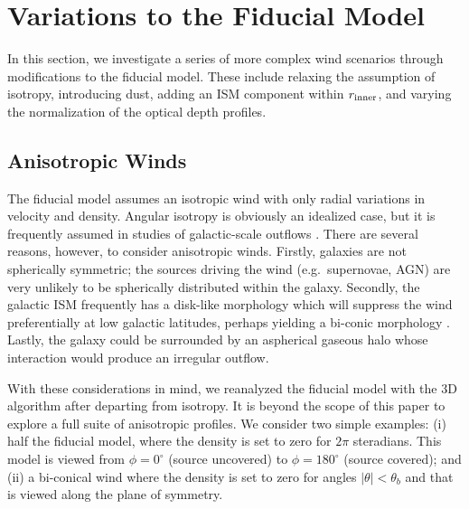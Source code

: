 \documentclass[12pt,preprint]{aastex}
\begin{document}
\section{Variations to the Fiducial Model}
\label{sec:variants}

In this section, we investigate a series of more complex wind
scenarios
through modifications to the fiducial model.  These include relaxing
the assumption of isotropy, introducing dust, adding an ISM
component within $r_{\rm inner}$, and varying the normalization of the
optical depth profiles.

\subsection{Anisotropic Winds}
\label{sec:anisotropic}

The fiducial model assumes an
isotropic wind with only radial variations in velocity and density. 
Angular isotropy is obviously an idealized case, but
it is frequently assumed in studies of galactic-scale outflows
\citep[e.g.][]{steidel+10}.   There are several reasons, however, to
consider anisotropic winds.  Firstly, galaxies are not spherically
symmetric;  the sources driving the
wind (e.g.\ supernovae, AGN) are very unlikely to be spherically distributed
within the galaxy.  
Secondly, the galactic ISM frequently has a disk-like morphology
which will suppress the wind preferentially at low galactic latitudes,
perhaps yielding a bi-conic morphology \citep[e.g.][]{ham90,wws02}.
Lastly, the galaxy could be surrounded by an
aspherical gaseous halo whose interaction would produce an irregular 
outflow.

With these considerations in mind, we reanalyzed the fiducial model
with the 3D algorithm after departing from isotropy.  It is beyond the
scope of this paper to explore a full suite of anisotropic profiles.
We consider two simple examples: (i) half the fiducial model, where 
the density is set to zero for $2\pi$ steradians.  This model is
viewed from $\phi = 0^\circ$ (source uncovered) 
to $\phi = 180^\circ$ (source covered); and 
(ii) a bi-conical wind where the density is set to zero for angles
$|\theta| < \theta_b$ and that is viewed along the plane of symmetry.
\end{document}
